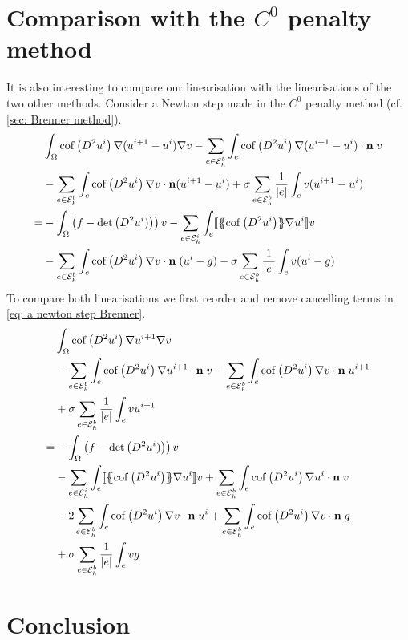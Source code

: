 \section{Comparison with the $C^0$ penalty method}
It is also interesting to compare our linearisation with the linearisations of the two other methods.
Consider a Newton step made in the $C^0$ penalty method (cf. \ref{sec: Brenner method}).
\begin{align}
	&\int_\Omega \operatorname{cof} \left( D^2 u^i \right) \nabla (u^{i+1}-u^i) \nabla v - \sum_{e \in \mathcal{E}_h^b} \int_e \operatorname{cof} \left( D^2 u^i \right) \nabla (u^{i+1}-u^i) \cdot \mathbf n \; v \nonumber \\
	&- \sum_{e \in \mathcal{E}_h^b} \int_e \operatorname{cof} \left( D^2 u^i \right) \nabla v \cdot \mathbf n (u^{i+1}-u^i) + \sigma \sum_{e \in \mathcal{E}_h^b} \frac 1 {|e|} \int_e v (u^{i+1}-u^i)\nonumber \\
	=&-\int_\Omega \left(f - \det{\left(D^2 u^i)\right)}\right) v  
			- \sum_{e \in \mathcal{E}_h^i} \int_e \llbracket  \{\!\!\{ \operatorname{cof} \left( D^2 u^i \right) \}\!\!\} \nabla {u^i}  \rrbracket v \nonumber \\
&	- \sum_{e \in \mathcal{E}_h^b} \int_e \operatorname{cof} \left( D^2 u^i \right) \nabla v \cdot \mathbf n \; (u^i-g) - \sigma \sum_{e \in \mathcal{E}_h^b} \frac 1 {|e|} \int_e v (u^{i}-g) \label{eq: a newton step Brenner}
\end{align}
To compare both linearisations we first reorder and remove cancelling terms in \eqref{eq: a newton step Brenner}.
\begin{align}
	&\int_\Omega \operatorname{cof} \left( D^2 u^i \right) \nabla u^{i+1} \nabla v \\
	&- \sum_{e \in \mathcal{E}_h^b} \int_e \operatorname{cof} \left( D^2 u^i \right) \nabla u^{i+1} \cdot \mathbf n \; v 
		- \sum_{e \in \mathcal{E}_h^b} \int_e \operatorname{cof} \left( D^2 u^i \right) \nabla v \cdot \mathbf n \; u^{i+1} \\
	&+\sigma \sum_{e \in \mathcal{E}_h^b} \frac 1 {|e|} \int_e v u^{i+1}\\
	=
	&-\int_\Omega \left(f - \det{\left(D^2 u^i)\right)}\right) v \\
	&- \sum_{e \in \mathcal{E}_h^i} \int_e \llbracket  \{\!\!\{ \operatorname{cof} \left( D^2 u^i \right) \}\!\!\} \nabla {u^i}  \rrbracket v 
		+ \sum_{e \in \mathcal{E}_h^b} \int_e \operatorname{cof} \left( D^2 u^i \right) \nabla {u^i} \cdot \mathbf n \; v\\
	&- 2\sum_{e \in \mathcal{E}_h^b} \int_e \operatorname{cof} \left( D^2 u^i \right) \nabla v \cdot \mathbf n \; {u^i}
		+ \sum_{e \in \mathcal{E}_h^b} \int_e \operatorname{cof} \left( D^2 u^i \right) \nabla v \cdot \mathbf n \; g \\
	&+\sigma \sum_{e \in \mathcal{E}_h^b} \frac 1 {|e|} \int_e v g \label{eq: ordered newton step Brenner}
\end{align}

\section{Conclusion}

